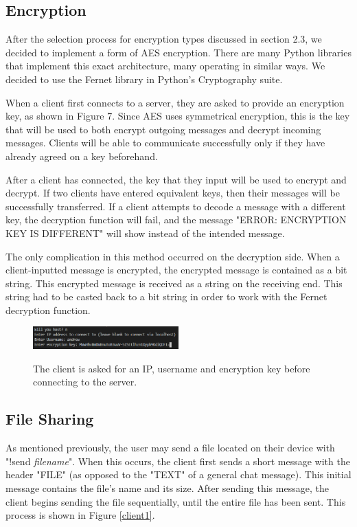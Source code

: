 \documentclass{article}
\begin{document}
\subsection{Encryption}

After the selection process for encryption types discussed in section 2.3, we decided to implement a form of AES encryption. There are many Python libraries that implement this exact architecture, many operating in similar ways. We decided to use the Fernet library in Python's Cryptography suite. 

When a client first connects to a server, they are asked to provide an encryption key, as shown in Figure 7. Since AES uses symmetrical encryption, this is the key that will be used to both encrypt outgoing messages and decrypt incoming messages. Clients will be able to communicate successfully only if they have already agreed on a key beforehand. 

After a client has connected, the key that they input will be used to encrypt and decrypt. If two clients have entered equivalent keys, then their messages will be successfully transferred. If a client attempts to decode a message with a different key, the decryption function will fail, and the message "ERROR: ENCRYPTION KEY IS DIFFERENT" will show instead of the intended message. 

The only complication in this method occurred on the decryption side. When a client-inputted message is encrypted, the encrypted message is contained as a bit string. This encrypted message is received as a string on the receiving end. This string had to be casted back to a bit string in order to work with the Fernet decryption function.

\begin{figure}[h]
\caption{The client is asked for an IP, username and encryption key before connecting to the server.}
\centering
\includegraphics[width=0.5\textwidth]{media/StartCode.PNG}
\label{client3}
\end{figure}

\subsection{File Sharing}

As mentioned previously, the user may send a file located on their device with "!send \emph{filename}". When this occurs, the client first sends a short message with the header "FILE" (as opposed to the "TEXT" of a general chat message). This initial message contains the file's name and its size. After sending this message, the client begins sending the file sequentially, until the entire file has been sent. This process is shown in Figure \ref{client1}.
\end{document}
